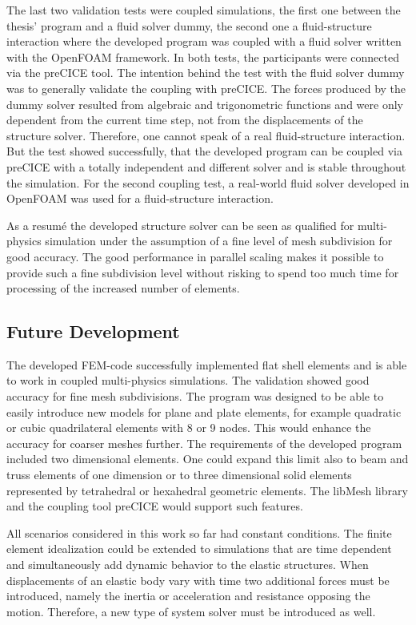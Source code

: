   The last two validation tests were coupled simulations, the first one between the thesis' program and a fluid solver dummy, the second one a fluid-structure interaction where the developed program was coupled with a fluid solver written with the OpenFOAM framework. In both tests, the participants were connected via the preCICE tool. The intention behind the test with the fluid solver dummy was to generally validate the coupling with preCICE. The forces produced by the dummy solver resulted from algebraic and trigonometric functions and were only dependent from the current time step, not from the displacements of the structure solver. Therefore, one cannot speak of a real fluid-structure interaction. But the test showed successfully, that the developed program can be coupled via preCICE with a totally independent and different solver and is stable throughout the simulation. For the second coupling test, a real-world fluid solver developed in OpenFOAM was used for a fluid-structure interaction. %
 
  As a resum\'{e} the developed structure solver can be seen as qualified for multi-physics simulation under the assumption of a fine level of mesh subdivision for good accuracy. The good performance in parallel scaling makes it possible to provide such a fine subdivision level without risking to spend too much time for processing of the increased number of elements.

 \subsection{Future Development}
  The developed FEM-code successfully implemented flat shell elements and is able to work in coupled multi-physics simulations. The validation showed good accuracy for fine mesh subdivisions. The program was designed to be able to easily introduce new models for plane and plate elements, for example quadratic or cubic quadrilateral elements with 8 or 9 nodes. This would enhance the accuracy for coarser meshes further. The requirements of the developed program included two dimensional elements. One could expand this limit also to beam and truss elements of one dimension or to three dimensional solid elements represented by tetrahedral or hexahedral geometric elements. The libMesh library and the coupling tool preCICE would support such features.
  
  All scenarios considered in this work so far had constant conditions. The finite element idealization could be extended to simulations that are time dependent and simultaneously add dynamic behavior to the elastic structures. When displacements of an elastic body vary with time two additional forces must be introduced, namely the inertia or acceleration and resistance opposing the motion. Therefore, a new type of system solver must be introduced as well.
\newpage